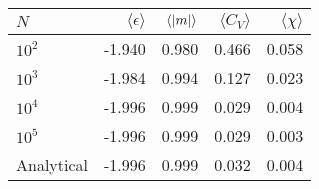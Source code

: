 \begin{tabular}{lrrrr}
\toprule
$N$ & $\langle \epsilon \rangle$ & $\langle \abs{m} \rangle$ & $\langle C_V \rangle$ & $\langle \chi \rangle$ \\
\midrule
$10^{2}$ & -1.940 & 0.980 & 0.466 & 0.058 \\
$10^{3}$ & -1.984 & 0.994 & 0.127 & 0.023 \\
$10^{4}$ & -1.996 & 0.999 & 0.029 & 0.004 \\
$10^{5}$ & -1.996 & 0.999 & 0.029 & 0.003 \\
Analytical & -1.996 & 0.999 & 0.032 & 0.004 \\
\bottomrule 
\end{tabular}
